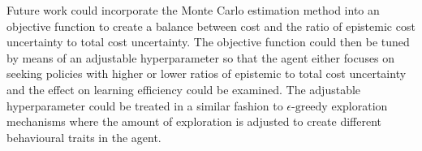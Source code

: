 Future work could incorporate the Monte Carlo estimation method into an objective function to create a balance between cost and the ratio of epistemic cost uncertainty to total cost uncertainty. The objective function could then be tuned by means of an adjustable hyperparameter so that the agent either focuses on seeking policies with higher or lower ratios of epistemic to total cost uncertainty and the effect on learning efficiency could be examined. The adjustable hyperparameter could be treated in a similar fashion to $\epsilon \text{-greedy}$ exploration mechanisms where the amount of exploration is adjusted to create different behavioural traits in the agent.



